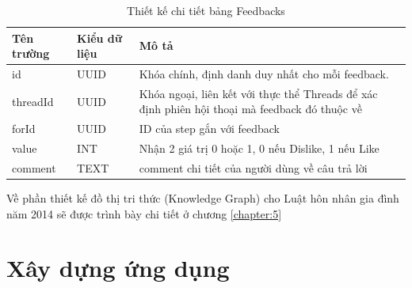 \documentclass[../DoAn.tex]{subfiles}
\begin{document}
\begin{table}[H]
\centering
\begin{tabular}{|l|l|p{8cm}|}
\hline
\textbf{Tên trường} & \textbf{Kiểu dữ liệu} & \textbf{Mô tả} \\ \hline
id & UUID & Khóa chính, định danh duy nhất cho mỗi feedback. \\ \hline
threadId & UUID & Khóa ngoại, liên kết với thực thể Threads để xác định phiên hội thoại mà feedback đó thuộc về \\ \hline
forId & UUID & ID của step gắn với feedback \\ \hline
value & INT & Nhận 2 giá trị 0 hoặc 1, 0 nếu Dislike, 1 nếu Like \\ \hline
comment & TEXT & comment chi tiết của người dùng về câu trả lời \\ \hline
\end{tabular}
\caption{Thiết kế chi tiết bảng Feedbacks}
\end{table}

Về phần thiết kế đồ thị tri thức (Knowledge Graph) cho Luật hôn nhân gia đình năm 2014 sẽ được trình bày chi tiết ở chương \ref{chapter:5}

\section{Xây dựng ứng dụng}
\end{document}
